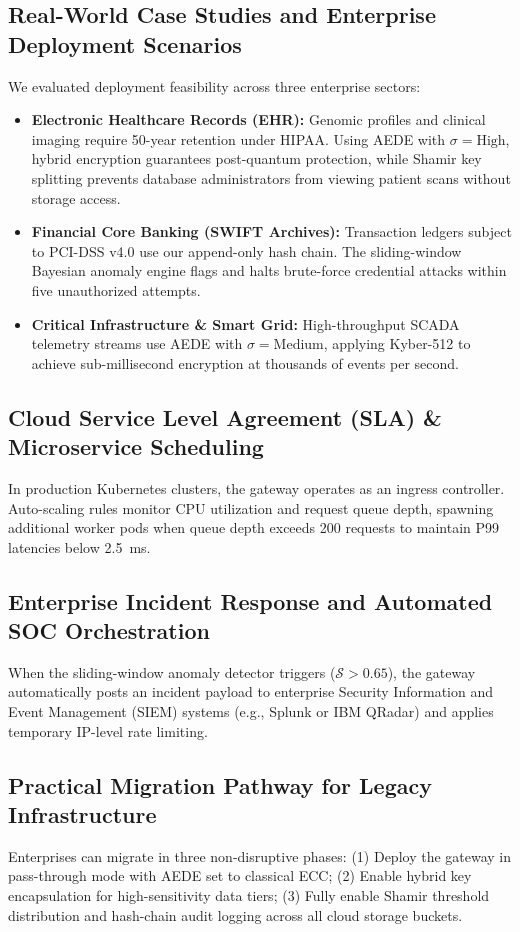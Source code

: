 \documentclass[pdflatex,sn-mathphys,Numbered]{sn-jnl}%
\theoremstyle{thmstyleone}%
\theoremstyle{thmstyletwo}%
\theoremstyle{thmstylethree}%
\begin{document}
\subsection{\textbf{Real-World Case Studies and Enterprise Deployment Scenarios}}
We evaluated deployment feasibility across three enterprise sectors:
\begin{itemize}
    \item \textbf{Electronic Healthcare Records (EHR):} Genomic profiles and clinical imaging require 50-year retention under HIPAA. Using AEDE with $\sigma=\text{High}$, hybrid encryption guarantees post-quantum protection, while Shamir key splitting prevents database administrators from viewing patient scans without storage access.
    \item \textbf{Financial Core Banking (SWIFT Archives):} Transaction ledgers subject to PCI-DSS v4.0 use our append-only hash chain. The sliding-window Bayesian anomaly engine flags and halts brute-force credential attacks within five unauthorized attempts.
    \item \textbf{Critical Infrastructure \& Smart Grid:} High-throughput SCADA telemetry streams use AEDE with $\sigma=\text{Medium}$, applying Kyber-512 to achieve sub-millisecond encryption at thousands of events per second.
\end{itemize}

\subsection{\textbf{Cloud Service Level Agreement (SLA) \& Microservice Scheduling}}
In production Kubernetes clusters, the gateway operates as an ingress controller. Auto-scaling rules monitor CPU utilization and request queue depth, spawning additional worker pods when queue depth exceeds 200 requests to maintain P99 latencies below 2.5~ms.

\subsection{\textbf{Enterprise Incident Response and Automated SOC Orchestration}}
When the sliding-window anomaly detector triggers ($\mathcal{S} > 0.65$), the gateway automatically posts an incident payload to enterprise Security Information and Event Management (SIEM) systems (e.g., Splunk or IBM QRadar) and applies temporary IP-level rate limiting.

\subsection{\textbf{Practical Migration Pathway for Legacy Infrastructure}}
Enterprises can migrate in three non-disruptive phases: (1) Deploy the gateway in pass-through mode with AEDE set to classical ECC; (2) Enable hybrid key encapsulation for high-sensitivity data tiers; (3) Fully enable Shamir threshold distribution and hash-chain audit logging across all cloud storage buckets.
\end{document}
